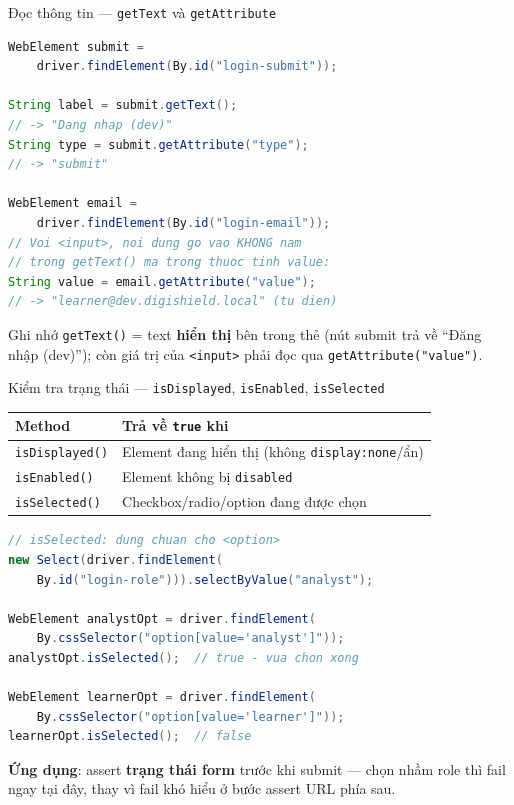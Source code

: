 \documentclass[aspectratio=169,12pt]{beamer}
\begin{document}
\begin{frame}[fragile]{Đọc thông tin --- \texttt{getText} và \texttt{getAttribute}}
\begin{lstlisting}[language=java,basicstyle=\ttfamily\scriptsize]
WebElement submit =
    driver.findElement(By.id("login-submit"));

String label = submit.getText();
// -> "Dang nhap (dev)"
String type = submit.getAttribute("type");
// -> "submit"

WebElement email =
    driver.findElement(By.id("login-email"));
// Voi <input>, noi dung go vao KHONG nam
// trong getText() ma trong thuoc tinh value:
String value = email.getAttribute("value");
// -> "learner@dev.digishield.local" (tu dien)
\end{lstlisting}

  \begin{block}{Ghi nhớ}
    \texttt{getText()} = text \textbf{hiển thị} bên trong thẻ (nút submit trả về
    ``Đăng nhập (dev)''); còn giá trị của \texttt{<input>} phải đọc qua
    \texttt{getAttribute("value")}.
  \end{block}
\end{frame}

\begin{frame}[fragile]{Kiểm tra trạng thái --- \texttt{isDisplayed}, \texttt{isEnabled}, \texttt{isSelected}}
  \begin{center}
  \footnotesize
  \begin{tabular}{>{\raggedright\arraybackslash}p{3.2cm}>{\raggedright\arraybackslash}p{8.2cm}}
    \toprule
    \textbf{Method} & \textbf{Trả về \texttt{true} khi} \\
    \midrule
    \texttt{isDisplayed()} & Element đang hiển thị (không \texttt{display:none}/ẩn) \\
    \texttt{isEnabled()} & Element không bị \texttt{disabled} \\
    \texttt{isSelected()} & Checkbox/radio/option đang được chọn \\
    \bottomrule
  \end{tabular}
  \end{center}

\begin{lstlisting}[language=java,basicstyle=\ttfamily\scriptsize]
// isSelected: dung chuan cho <option>
new Select(driver.findElement(
    By.id("login-role"))).selectByValue("analyst");

WebElement analystOpt = driver.findElement(
    By.cssSelector("option[value='analyst']"));
analystOpt.isSelected();  // true - vua chon xong

WebElement learnerOpt = driver.findElement(
    By.cssSelector("option[value='learner']"));
learnerOpt.isSelected();  // false
\end{lstlisting}

  {\small \textbf{Ứng dụng}: assert \textbf{trạng thái form} trước khi submit
  --- chọn nhầm role thì fail ngay tại đây, thay vì fail khó hiểu ở bước
  assert URL phía sau.}
\end{frame}
\end{document}

